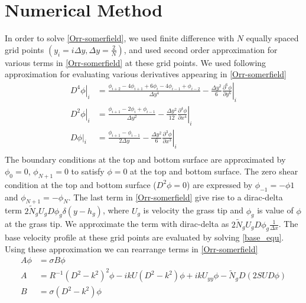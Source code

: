 \documentclass[12pt]{report}   %
\newcommand{\del}{\partial}
\newcommand{\Rey}{{R}}
\newcommand{\Ndg}{\tilde{N}_g}
\begin{document}
\section{Numerical Method}
  In order to solve \eqref{Orr-somerfield}, we used finite difference with $N$ equally spaced grid points $(y_i = i\Delta y, \Delta y = \frac{2}{N})$, and used second order approximation for various terms in \eqref{Orr-somerfield} at these grid points. We used following approximation for evaluating various derivatives appearing in \eqref{Orr-somerfield}
  \begin{equation}
  \begin{align}
    \left.{ D^4\phi} \right|_i &= \frac{ \phi_{i+2}-4\phi_{i+1}+6\phi_{i}-4\phi_{i-1}+\phi_{i-2} }{\Delta y^4} - \frac{\Delta y^2}{6} \left. \frac{\del^6 \phi}{\del y^6} \right |_i \\
    \left. D^2\phi \right|_i &=  \frac{\phi_{i+1} -2\phi_i +\phi_{i-1}}{\Delta y^2} - \left. \frac{\Delta y^2}{12} \frac{\del^4 \phi}{\del x^4} \right|_i \\    
    \left. D\phi \right|_i &=  \frac{\phi_{i+1} -\phi_{i-1}}{2\Delta y} - \left. \frac{\Delta y^2}{6} \frac{\del^3 \phi}{\del x^3} \right|_i \\
    \end{align}
  \end{equation}
The boundary conditions at the top and bottom surface are approximated by $\phi_0 = 0$,  $\phi_{N+1} = 0$ to satisfy $\phi=0$ at the top and bottom surface.
The zero shear condition at the top and bottom surface ($D^2\phi=0$) are expressed by $\phi_{-1} = -\phi{1}$ and $\phi_{N+1} = -\phi_{N}$. The last term in \eqref{Orr-somerfield} give rise to a dirac-delta term $2\Ndg U_g D\phi_g \delta(y-h_g)$, where $U_g$ is velocity the grass tip and $\phi_g$ is value of $\phi$ at the grass tip. We approximate the term with dirac-delta as $2\Ndg U_g D\phi_{g} \frac{1}{\Delta x}$.
The base velocity profile at these grid points are evaluated by solving \eqref{base_equ}. Using these approximation we can rearrange terms in \eqref{Orr-somerfield} 
\begin{equation}
\begin{split}
A\phi &= \sigma B \phi\\
A &= \Rey^{-1}\left(D^2 -k^{2} \right)^2\phi-ikU \left(D^2-k^2\right)\phi + ik U_{yy}\phi -\Ndg D\left(2 S U D \phi\right)\\
B &= {\sigma} \left(D^2-k^2\right) \phi
\end{split}
\end{equation}
\end{document}
